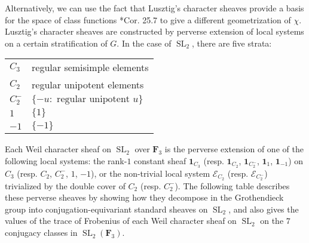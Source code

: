 \documentclass[10pt]{amsart}
\theoremstyle{plain}
\theoremstyle{definition}
\newcommand{\FFF}{{\mathbf{F}_3}}
\DeclareMathOperator{\SL}{SL}
\newcommand{\cs}[1]{{\mathcal{#1}}}
\begin{document}
Alternatively, we can use the fact that Lusztig's character sheaves provide a basis for the space of class functions \cite{lusztig:86a}*{Cor. 25.7} to give a different geometrization of $\chi$.  Lusztig's character sheaves are constructed by perverse extension of local systems on a certain stratification of $G$.  In the case of $\SL_2$, there are five strata:

\vspace{0.1in}

\begin{center}
\begin{spacing}{1.3}
\begin{tabular}{|l|l|}
\hline
$C_3$ & regular semisimple elements \\
$C_2$ & regular unipotent elements \\
$C_2^-$ & $\{-u : \mbox{ regular unipotent $u$}\}$ \\
$1$ & $\{1\}$ \\
$-1$ & $\{-1\}$ \\
\hline
\end{tabular}
\end{spacing}
\end{center}

\noindent
Each Weil character sheaf on $\SL_2$ over $\FFF$ is the perverse extension of one of the following local systems: the rank-$1$ constant sheaf $\mathbf{1}_{C_3}$ (resp. $\mathbf{1}_{C_2}$, $\mathbf{1}_{C_2^-}$, $\mathbf{1}_{1}$,  $\mathbf{1}_{-1}$) on $C_3$ (resp. $C_2$, $C_2^-$, $1$, $-1$), or the non-trivial local system $\cs{E}_{C_2}$  (resp.  $\cs{E}_{C_2^-}$) trivialized by the  double cover of $C_2$ (resp. $C_2^-$).
The following table describes these perverse sheaves by showing how they decompose in the Grothendieck group into conjugation-equivariant standard sheaves on $\SL_2$, and also gives the values of the trace of Frobenius of each Weil character sheaf on $\SL_2$ on the $7$ conjugacy classes in $\SL_2(\FFF)$.

\vspace{0.1in}
\end{document}
